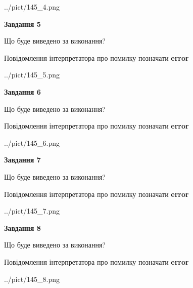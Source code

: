 \documentclass[12pt, ukrainian]{article}
\begin{document}
{\begin{center}
	{../pict/145_4.png}
\end{center}
\newpage

{\begin {center}\textbf{Завдання 5}\end {center}}\par
Що буде виведено за виконання? \par
Повідомлення інтерпретатора про помилку позначати \textbf{error}

\begin{center}
	{../pict/145_5.png}
\end{center}
\newpage

{\begin {center}\textbf{Завдання 6}\end {center}}\par
Що буде виведено за виконання? \par
Повідомлення інтерпретатора про помилку позначати \textbf{error}

\begin{center}
	{../pict/145_6.png}
\end{center}
\newpage

{\begin {center}\textbf{Завдання 7}\end {center}}\par
Що буде виведено за виконання? \par
Повідомлення інтерпретатора про помилку позначати \textbf{error}

\begin{center}
	{../pict/145_7.png}
\end{center}
\newpage

{\begin {center}\textbf{Завдання 8}\end {center}}\par
Що буде виведено за виконання? \par
Повідомлення інтерпретатора про помилку позначати \textbf{error}

\begin{center}
	{../pict/145_8.png}
\end{center}
\newpage

}
\end{document}
